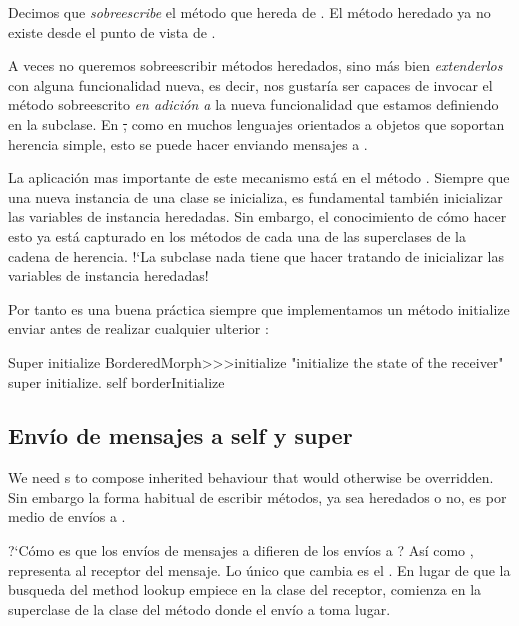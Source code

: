 \documentclass[a4paper,10pt,twoside]{book}
\begin{document}
Decimos que  \emph{sobreescribe} el m\'etodo  que hereda de .
El m\'etodo heredado ya no existe desde el punto de vista de .

A veces no queremos sobreescribir m\'etodos heredados, sino m\'as bien \emph{extenderlos} con alguna funcionalidad nueva, es decir, nos gustar\'ia ser capaces de invocar el m\'etodo sobreescrito \emph{en adici\'on a} la nueva funcionalidad que estamos definiendo en la subclase.
En \st, como en  muchos lenguajes orientados a objetos que soportan herencia simple, esto se puede hacer enviando mensajes a \super.

La aplicaci\'on mas importante de este mecanismo est\'a en el m\'etodo .
Siempre que una nueva instancia de una clase se inicializa, es fundamental tambi\'en inicializar las variables de instancia heredadas.
Sin embargo, el conocimiento de c\'omo hacer esto ya est\'a capturado en los m\'etodos  de cada una de las superclases de la cadena de herencia.
!`La subclase nada tiene que hacer tratando de inicializar las variables de instancia heredadas!

Por tanto es una buena pr\'actica siempre que implementamos un m\'etodo initialize enviar  antes de realizar cualquier ulterior :

\begin{method}[morphinit]{Super initialize}
BorderedMorph>>>initialize
	"initialize the state of the receiver"
	super initialize.
	self borderInitialize
\end{method}


\subsection{Env\'io de mensajes a self y super}

We need \super {}s to compose inherited behaviour that would otherwise be overridden.
Sin embargo la forma habitual de escribir m\'etodos, ya sea heredados o no, es por medio de env\'ios a \self {}.

?`C\'omo es que los env\'ios de mensajes a \self difieren de los env\'ios a \super ?
As\'i como \self, \super representa al receptor del mensaje.
Lo \'unico que cambia es el .
En lugar de que la busqueda del method lookup empiece en la clase del receptor, comienza en la superclase de la clase del m\'etodo donde el env\'io a \super toma lugar.
\end{document}

